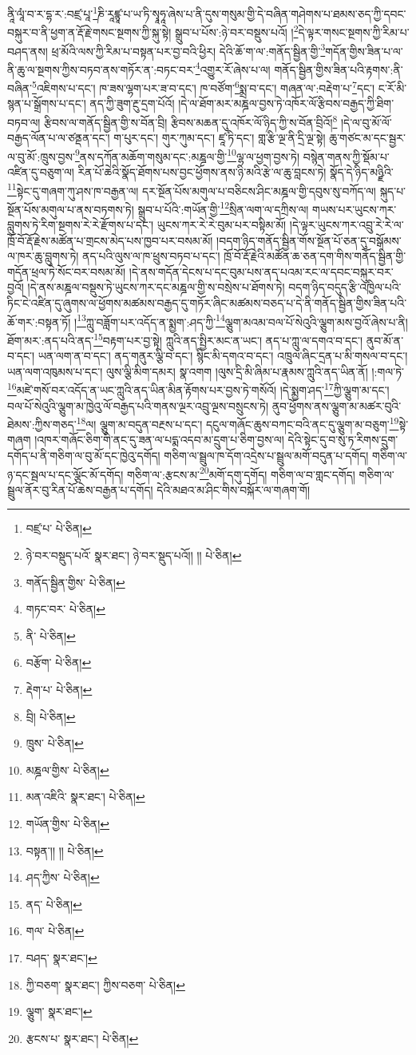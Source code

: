 ནཱི་ལཱཾ་བ་ར་དྷ་ར་:བཛྲ་པཱ་\footnote{བཛྲ་པ་  པེ་ཅིན། }ཎི་རཱཛྙཱ་པ་ཡ་ཏི་སྭཱཧཱ་ཞེས་པ་ནི་དུས་གསུམ་གྱི་དེ་བཞིན་གཤེགས་པ་ཐམས་ཅད་ཀྱི་དབང་བསྐུར་བ་ནི་ཕྱག་ན་རྡོ་རྗེ་གསང་སྔགས་ཀྱི་སྐུ་སྟེ། སྒྲུབ་པ་པོས་:ཉེ་བར་བསྡུས་པའོ། །\footnote{ཉེ་བར་བསྡུད་པའོ་  སྣར་ཐང་། ཉེ་བར་སྡུད་པའོ།། །།  པེ་ཅིན། }དེ་ལྟར་གསང་སྔགས་ཀྱི་རིམ་པ་བཤད་ནས། ཕྲ་མོའི་ལས་ཀྱི་རིམ་པ་བསྟན་པར་བྱ་བའི་ཕྱིར། དེའི་ཆོ་ག་ལ་:གནོད་སྦྱིན་གྱི་\footnote{གནོད་སྦྱིན་གྱིས་  པེ་ཅིན། }གདོན་གྱིས་ཟིན་པ་ལ་ནི་ཆུ་ལ་སྔགས་ཀྱིས་བཏབ་ནས་གཏོར་ན་:བཏང་བར་\footnote{གཏང་བར་  པེ་ཅིན། }འགྱུར་རོ་ཞེས་པ་ལ། གནོད་སྦྱིན་གྱིས་ཟིན་པའི་རྟགས་:ནི་བཞིན་\footnote{ནི་  པེ་ཅིན། }འཇིགས་པ་དང་། ཁ་ཟས་ལྷག་པར་ཟ་བ་དང་། ཁ་བཙོག་\footnote{བརྩོག་  པེ་ཅིན། }སྨྲ་བ་དང་། གཞན་ལ་:བརྡེག་པ་\footnote{རྡེག་པ་  པེ་ཅིན། }དང་། ང་རོ་མི་སྙན་པ་སྒྲོགས་པ་དང་། ནད་ཀྱི་ཟུག་རྔུ་དྲག་པོའོ། །དེ་ལ་ཐོག་མར་མཎྜལ་བྱས་ཏེ་འཁོར་ལོ་རྩིབས་བརྒྱད་ཀྱི་ཐིག་བཏབ་ལ། རྩིབས་ལ་གནོད་སྦྱིན་གྱི་ས་བོན་བྲི། རྩིབས་མཆན་དུ་འཁོར་ལོ་ཉིད་ཀྱི་ས་བོན་བྲིའོ།\footnote{བྲི།  པེ་ཅིན། } །དེ་ལ་བུ་མོ་ལོ་བརྒྱད་ལོན་པ་ལ་ཙནྡན་དང་། ག་པུར་དང་། གུར་ཀུམ་དང་། ཛཱ་ཏི་དང་། གླ་རྩི་ལྔ་ནི་དྲི་ལྔ་སྟེ། ཆུ་གཙང་མ་དང་སྦྱར་ལ་བུ་མོ་:ཁྲུས་བྱས་\footnote{ཁྲུས་  པེ་ཅིན། }ནས་དཀོན་མཆོག་གསུམ་དང་:མཎྜལ་གྱི་\footnote{མཎྜལ་གྱིས་  པེ་ཅིན། }ལྷ་ལ་ཕྱག་བྱས་ཏེ། བསྙེན་གནས་ཀྱི་སྡོམ་པ་འཛིན་དུ་བཅུག་ལ། རིན་པོ་ཆེའི་སྣོད་ཐོགས་པས་བྱང་ཕྱོགས་ནས་ཉི་མའི་རྩེ་ལ་ཆུ་བླངས་ཏེ། སྣོད་དེ་ཉིད་མཉྫིའི་\footnote{མན་འཇིའི་  སྣར་ཐང་།  པེ་ཅིན། }སྟེང་དུ་གཞག་ཀུ་ཤས་ཁ་བརྒྱན་ལ། དར་སྔོན་པོས་མགུལ་པ་བཅིངས་ཤིང་མཎྜལ་གྱི་དབུས་སུ་བཀོད་ལ། སྐུད་པ་སྔོན་པོས་མགུལ་པ་ནས་བཏགས་ཏེ། སྒྲུབ་པ་པོའི་:གཡོན་གྱི་\footnote{གཡོན་གྱིས་  པེ་ཅིན། }སྲིན་ལག་ལ་དཀྲིས་ལ། གཡས་པར་ཡུངས་ཀར་བླུགས་ཏེ་རིག་སྔགས་རེ་རེ་རྫོགས་པ་དང་། ཡུངས་ཀར་རེ་རེ་བུམ་པར་བསྟིམ་མོ། །དེ་ལྟར་ཡུངས་ཀར་འབྲུ་རེ་རེ་ལ་ཁྲོ་བོ་རྡོ་རྗེས་མཚོན་པ་གྲངས་མེད་པས་ཁྱབ་པར་བསམ་མོ། །བདག་ཉིད་གནོད་སྦྱིན་གོས་སྔོན་པོ་ཅན་དུ་བསྒོམས་ལ་ཁར་ཆུ་བླུགས་ཏེ། ནད་པའི་ལུས་ལ་ཁ་ཕྲུས་བཏབ་པ་དང་། ཁྲོ་བོ་རྡོ་རྗེའི་མཚོན་ཆ་ཅན་དག་གིས་གནོད་སྦྱིན་གྱི་གདོན་ཕྲལ་ཏེ་སོང་བར་བསམ་མོ། །དེ་ནས་གདོན་དེངས་པ་དང་བུམ་པས་ནད་པའམ་རང་ལ་དབང་བསྐུར་བར་བྱའོ། །དེ་ནས་མཎྜལ་བསྡུས་ཏེ་ཡུངས་ཀར་དང་མཎྜལ་གྱི་ས་བསྲེས་པ་ཐོགས་ཏེ། བདག་ཉིད་བདུད་རྩི་འཁྱིལ་པའི་ཏིང་ངེ་འཛིན་དུ་ཞུགས་ལ་ཕྱོགས་མཚམས་བརྒྱད་དུ་གཏོར་ཞིང་མཚམས་བཅད་པ་དེ་ནི་གནོད་སྦྱིན་གྱིས་ཟིན་པའི་ཆོ་གར་:བསྟན་ཏོ། །\footnote{བསྟན་།། །།  པེ་ཅིན། }ཀླུ་བཟློག་པར་འདོད་ན་སྨྱག་:ཤད་ཀྱི་\footnote{ཤད་ཀྱིས་  པེ་ཅིན། }ལྕུག་མའམ་བལ་པོ་སེའུའི་ལྕུག་མས་བྱའོ་ཞེས་པ་ནི། ཐོག་མར་:ནད་པའི་ནད་\footnote{ནད་  པེ་ཅིན། }བརྟག་པར་བྱ་སྟེ། ཀླུའི་ནད་སྤྱིར་མང་ན་ཡང་། ནད་པ་ཀླུ་ལ་དགའ་བ་དང་། ནུབ་མོ་ན་བ་དང་། ཡན་ལག་ན་བ་དང་། ནད་གནུར་ལྕི་བ་དང་། སྙིང་མི་དགའ་བ་དང་། འཁྲུལ་ཞིང་དྲན་པ་མི་གསལ་བ་དང་། ཡན་ལག་འཁུམས་པ་དང་། ལུས་ལྕི་མིག་དམར། སྣ་འགག །ལུས་དྲི་མི་ཞིམ་པ་རྣམས་ཀླུའི་ནད་ཡིན་ནོ། །:གལ་ཏེ་\footnote{གལ་  པེ་ཅིན། }མཛེ་གསོ་བར་འདོད་ན་ཡང་ཀླུའི་ནད་ཡིན་མིན་རྟོགས་པར་བྱས་ཏེ་གསོའོ། །དེ་སྨྱག་ཤད་\footnote{བཤད་  སྣར་ཐང་། }ཀྱི་ལྕུག་མ་དང་། བལ་པོ་སེའུའི་ལྕུག་མ་ཁྱེའུ་ལོ་བརྒྱད་པའི་གནས་ལྔར་འབྲུ་ལྔས་བསྲུངས་ཏེ། ནུབ་ཕྱོགས་ནས་ལྕུག་མ་མཚར་བུའི་ཐེམས་:ཀྱིས་གཅད་\footnote{ཀྱི་བཅག་  སྣར་ཐང་། ཀྱིས་བཅག་  པེ་ཅིན། }ལ། ལྕུག་མ་བདུན་བརྔས་པ་དང་། དངུལ་གཞོང་ཆུས་བཀང་བའི་ནང་དུ་ལྕུག་མ་བཅུག་\footnote{ལྕུག་  སྣར་ཐང་། }སྟེ་གཞག །འཁར་གཞོང་ཅིག་གི་ནང་དུ་ཟན་ལ་པདྨ་འདབ་མ་དྲུག་པ་ཅིག་བྱས་ལ། དེའི་སྟེང་དུ་བ་སུ་ཏ་རིགས་དྲུག་དགོད་པ་ནི་གཅིག་ལ་བུ་མོ་དང་ཁྱེའུ་དགོད། གཅིག་ལ་སྦྲུལ་ཁ་དོག་འདྲེས་པ་སྦྲུལ་མགོ་བདུན་པ་དགོད། གཅིག་ལ་ཉ་དང་སྦལ་པ་དང་ལྕོང་མོ་དགོད། གཅིག་ལ་:རྩངས་མ་\footnote{རྩངས་པ་  སྣར་ཐང་།  པེ་ཅིན། }མགོ་དགུ་དགོད། གཅིག་ལ་བ་གླང་དགོད། གཅིག་ལ་སྦྲུལ་ནོར་བུ་རིན་པོ་ཆེས་བརྒྱན་པ་དགོད། དེའི་མཐའ་མ་ཤིང་གིས་བསྐོར་ལ་གཞག་གོ། 